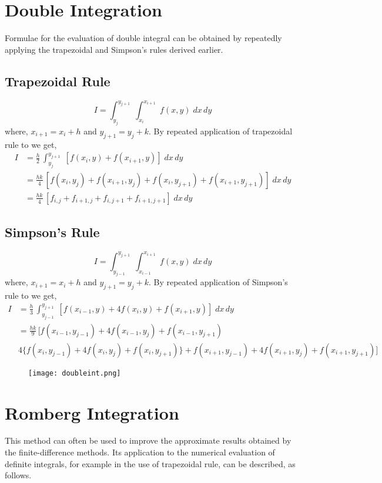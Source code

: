 \documentclass[aima203_lecturenotes_ku.tex]{subfiles}
\begin{document}
\section{Double Integration}
Formulae for the evaluation of double integral can be obtained by repeatedly applying the trapezoidal and Simpson's rules derived earlier.
\subsection{Trapezoidal Rule}
\begin{equation*}
  I = \int_{y_j}^{y_{j+1}}\; \int_{x_i}^{x_{i+1}} \; f(x,y)\;dx\,dy
\end{equation*}
where, $x_{i+1} = x_i + h$ and $y_{j+1} = y_j + k$.
By repeated application of trapezoidal rule to we get,
\begin{equation}
  \label{trapdouble}
  \begin{aligned}
    I &= \frac{h}{2} \,\int_{y_j}^{y_{j+1}}\; [f(x_i,y) + f(x_{i+1},y) ]\;dx\,dy \\[1mm]
      &= \frac{hk}{4} \, [f(x_i,y_j) + f(x_{i+1},y_j) + f(x_i,y_{j+1}) + f(x_{i+1},y_{j+1}) ]\;dx\,dy \\[1mm]
      &= \frac{hk}{4} \, [f_{i,j} + f_{i+1, j} + f_{i,j+1} + f_{i+1,j+1} ]\;dx\,dy
  \end{aligned}
\end{equation}

\subsection{Simpson's Rule}
\begin{equation*}
  I = \int_{y_{j-1}}^{y_{j+1}}\; \int_{x_{i-1}}^{x_{i+1}} \; f(x,y)\;dx\,dy
\end{equation*}
where, $x_{i+1} = x_i + h$ and $y_{j+1} = y_j + k$.
By repeated application of Simpson's rule to we get,
\begin{equation}
  \label{simpdouble}
  \begin{aligned}
    I &= \frac{h}{3} \,\int_{y_{j-1}}^{y_{j+1}}\; [f(x_{i-1},y) + 4f(x_i,y) + f(x_{i+1},y) ]\;dx\,dy \\[1mm]
      &= \frac{hk}{9} \, [f(x_{i-1},y_{j-1}) + 4f(x_{i-1},y_j) + f(x_{i-1},y_{j+1}) \\[1mm]
    & 4\{f(x_i,y_{j-1}) + 4f(x_i,y_j) + f(x_i,y_{j+1})\} + f(x_{i+1},y_{j-1}) + 4f(x_{i+1},y_j) + f(x_{i+1},y_{j+1})]
  \end{aligned}
\end{equation}
\vspace{1cm}

\begin{figure}[h]
  \centering
\texttt{[image: doubleint.png]}
\end{figure}

\section{Romberg Integration}
This method can often be used to improve the approximate results obtained by the finite-difference methods. Its application to the numerical evaluation of definite integrals, for example in the use of trapezoidal rule, can be described, as follows.
\end{document}
